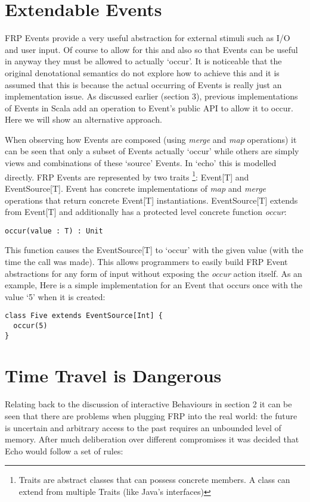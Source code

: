   \section{Extendable Events}
    FRP Events provide a very useful abstraction for external stimuli such as I/O and user input. Of course
    to allow for this and also so that Events can be useful in anyway they must be allowed to actually `occur'.
    It is noticeable that the original denotational semantics \cite{Elliott1997} do not explore how to achieve
    this and it is assumed that this is because the actual occurring of Events is really just an implementation
    issue. As discussed earlier (section 3), previous implementations of Events in Scala add an operation to Event's
    public API to allow it to occur. Here we will show an alternative approach.
    
    When observing how Events are composed (using \emph{merge} and \emph{map} operations) it can be seen that
    only a subset of Events actually `occur' while others are simply views and combinations of these `source' Events.
    In `echo' this is modelled directly. FRP Events are represented by two traits \footnote{Traits are abstract
    classes that can possess concrete members. A class can extend from multiple Traits (like Java's interfaces)}: 
    Event[T] and EventSource[T].
    Event has concrete implementations of \emph{map} and \emph{merge} operations that
    return concrete Event[T] instantiations. EventSource[T] extends
    from Event[T] and additionally has a protected level concrete function \emph{occur}:
    
\begin{verbatim}
occur(value : T) : Unit
\end{verbatim}  

    This function causes the EventSource[T] to `occur' with the given value (with the time the call was made). This allows 
    programmers
    to easily build FRP Event abstractions for any form of input without exposing the \emph{occur} action itself.
    As an example, Here is a simple implementation for an Event that occurs once with the value `5' when it 
    is created:
    
\begin{verbatim}
class Five extends EventSource[Int] {
  occur(5)
}
\end{verbatim} 

  \section{Time Travel is Dangerous}
    Relating back to the discussion of interactive Behaviours in section 2 it can be seen
    that there are problems when plugging FRP into the real world: the future is uncertain and
    arbitrary access to the past requires an unbounded level of memory. After much deliberation
    over different compromises it was decided that Echo would follow a set of rules:
    

